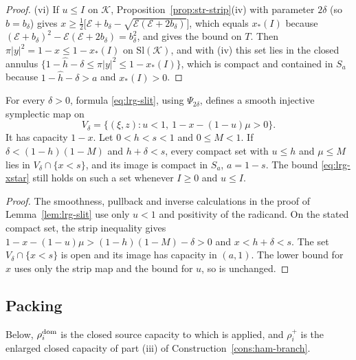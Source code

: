\begin{proof}
(vi) If $u\le I$ on $\mathcal K$, Proposition~\ref{prop:str-strip}(iv) with parameter $2\delta$ (so $b=b_\delta$) gives
$x\ge\frac12\bigl[\mathcal E+b_\delta-\sqrt{\mathcal E(\mathcal E+2b_\delta)}\bigr]$, which equals $x_*(I)$ because
$(\mathcal E+b_\delta)^2-\mathcal E(\mathcal E+2b_\delta)=b_\delta^2$, and gives the bound on $T$. Then $\pi|y|^2=1-x\le1-x_*(I)$ on
$\mathrm{Sl}(\mathcal K)$, and with (iv) this set lies in the closed annulus $\{1-\hat h-\delta\le\pi|y|^2\le1-x_*(I)\}$, which is compact
and contained in $S_a$ because $1-\hat h-\delta>a$ and $x_*(I)>0$.
\end{proof}

\begin{proposition}\label{prop:lrg-slit-domain}
For every $\delta>0$, formula \eqref{eq:lrg-slit}, using $\Psi_{2\delta}$, defines a smooth injective symplectic
map on
\[
 V_\delta=\{(\xi,z):u<1,\ 1-x-(1-u)\mu>0\}.
\]
It has capacity $1-x$. Let $0<h<s<1$ and $0\le M<1$. If
$\delta<(1-h)(1-M)$ and $h+\delta<s$, every compact set with $u\le h$ and $\mu\le M$
lies in $V_\delta\cap\{x<s\}$, and its image is compact in $S_a$, $a=1-s$.
The bound \eqref{eq:lrg-xstar} still holds on such a set whenever $I\ge0$ and $u\le I$.
\end{proposition}

\begin{proof}
The smoothness, pullback and inverse calculations in the proof of Lemma~\ref{lem:lrg-slit} use only $u<1$ and positivity of the
radicand. On the stated compact set, the strip inequality gives
$1-x-(1-u)\mu>(1-h)(1-M)-\delta>0$ and $x<h+\delta<s$.
The set $V_\delta\cap\{x<s\}$ is open and its image has capacity in $(a,1)$.
The lower bound for $x$ uses only the strip map and the bound for $u$, so is unchanged.
\end{proof}

\subsection{Packing}\label{sec:two-packing}

Below,
$\rho_i^{\rm dom}$ is the closed source capacity to which  is applied, and $\rho_i^+$ is
the enlarged closed capacity of part (iii) of Construction~\ref{cons:ham-branch}.

